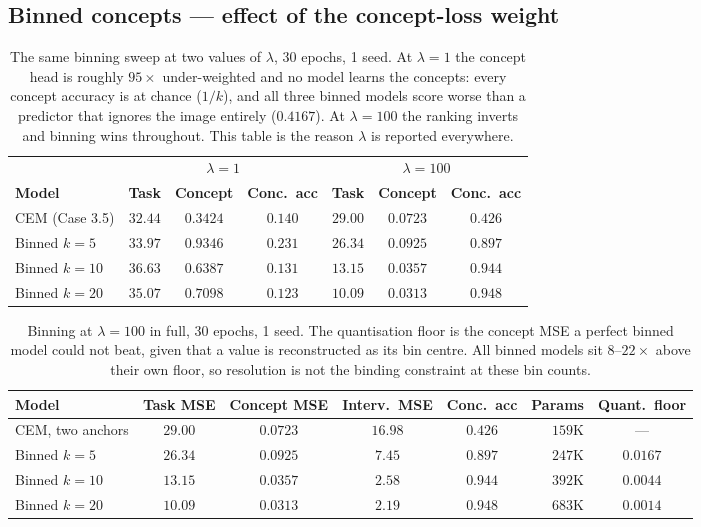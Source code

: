 \documentclass[11pt]{article}
\begin{document}
\subsection{Binned concepts --- effect of the concept-loss weight}

\begin{table}[h]
\centering
\caption{The same binning sweep at two values of $\lambda$, 30 epochs, 1 seed.
At $\lambda = 1$ the concept head is roughly $95\times$ under-weighted and no
model learns the concepts: every concept accuracy is at chance ($1/k$), and all
three binned models score worse than a predictor that ignores the image
entirely ($0.4167$). At $\lambda = 100$ the ranking inverts and binning wins
throughout. This table is the reason $\lambda$ is reported everywhere.}
\label{tab:app-lambda}
\begin{tabular}{lcccccc}
\toprule
& \multicolumn{3}{c}{$\lambda = 1$} & \multicolumn{3}{c}{$\lambda = 100$} \\
\cmidrule(lr){2-4}\cmidrule(lr){5-7}
\textbf{Model} & \textbf{Task} & \textbf{Concept} & \textbf{Conc.\ acc} &
                 \textbf{Task} & \textbf{Concept} & \textbf{Conc.\ acc} \\
\midrule
CEM (Case 3.5) & $32.44$ & $0.3424$ & $0.140$ & $29.00$ & $0.0723$ & $0.426$ \\
Binned $k=5$   & $33.97$ & $0.9346$ & $0.231$ & $26.34$ & $0.0925$ & $0.897$ \\
Binned $k=10$  & $36.63$ & $0.6387$ & $0.131$ & $13.15$ & $0.0357$ & $0.944$ \\
Binned $k=20$  & $35.07$ & $0.7098$ & $0.123$ & $\mathbf{10.09}$ & $\mathbf{0.0313}$ & $\mathbf{0.948}$ \\
\bottomrule
\end{tabular}
\end{table}

\begin{table}[h]
\centering
\caption{Binning at $\lambda = 100$ in full, 30 epochs, 1 seed. The
quantisation floor is the concept MSE a perfect binned model could not beat,
given that a value is reconstructed as its bin centre. All binned models sit
$8$--$22\times$ above their own floor, so resolution is not the binding
constraint at these bin counts.}
\label{tab:app-binned}
\begin{tabular}{lccccrc}
\toprule
\textbf{Model} & \textbf{Task MSE} & \textbf{Concept MSE} &
\textbf{Interv.\ MSE} & \textbf{Conc.\ acc} & \textbf{Params} &
\textbf{Quant.\ floor} \\
\midrule
CEM, two anchors & $29.00$ & $0.0723$ & $16.98$ & $0.426$ & $159$K & --- \\
Binned $k=5$     & $26.34$ & $0.0925$ & $7.45$  & $0.897$ & $247$K & $0.0167$ \\
Binned $k=10$    & $13.15$ & $0.0357$ & $2.58$  & $0.944$ & $392$K & $0.0044$ \\
Binned $k=20$    & $\mathbf{10.09}$ & $\mathbf{0.0313}$ & $\mathbf{2.19}$ &
                   $\mathbf{0.948}$ & $683$K & $0.0014$ \\
\bottomrule
\end{tabular}
\end{table}
\end{document}
